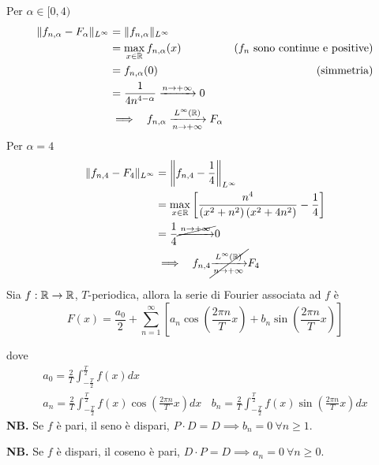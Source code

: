 \begin{enumerate}
Per $\alpha \in [ 0,4)$\begin{equation*}
\begin{aligned}
\Vert f_{n,\alpha } -F_{\alpha }\Vert _{L^{\infty }} & =\Vert f_{n,\alpha }\Vert _{L^{\infty }} & \\
 & =\max_{x\in \RR } f_{n,\alpha }( x) & \left( f_{n} \ \text{sono continue e positive}\right)\\
 & =f_{n,\alpha }( 0) & \text{(simmetria)}\\
 & =\frac{1}{4n^{4-\alpha }}\xrightarrow{n\rightarrow +\infty } 0 & \\
 & \implies \ \ f_{n,\alpha }\xrightarrow[n\rightarrow +\infty ]{L^{\infty }(\RR )} F_{\alpha } & 
\end{aligned}
\end{equation*}Per $\alpha =4$\begin{equation*}
\begin{aligned}
\Vert f_{n,4} -F_{4}\Vert _{L^{\infty }} & =\left\Vert f_{n,4} -\frac{1}{4}\right\Vert _{L^{\infty }}\\
 & =\max_{x\in \mathbb{R} }\left[\frac{n^{4}}{\left( x^{2} +n^{2}\right)\left( x^{2} +4n^{2}\right)} -\frac{1}{4}\right]\\
 & =\frac{1}{4}\cancel{\xrightarrow{n\rightarrow +\infty }} 0\\
 & \implies \ \ f_{n,4}\cancel{\xrightarrow[n\rightarrow +\infty ]{L^{\infty }(\mathbb{R} )}} F_{4}
\end{aligned}
\end{equation*}
\end{enumerate}
\Soluzione
\begin{thm}
Sia $f:\mathbb{R} \rightarrow \mathbb{R} $, $T$-periodica, allora la serie di Fourier associata ad $f$ è\begin{equation*}
F( x) =\frac{a_{0}}{2} +\sum\limits ^{\infty }_{n=1}\left[ a_{n}\cos\left(\frac{2\pi n}{T} x\right) +b_{n}\sin\left(\frac{2\pi n}{T} x\right)\right]
\end{equation*}

dove
\begin{gather*}
a_{0} =\frac{2}{T}\int ^{\frac{T}{2}}_{-\frac{T}{2}} f( x) dx\\
a_{n} =\frac{2}{T}\int ^{\frac{T}{2}}_{-\frac{T}{2}} f( x)\cos\left(\frac{2\pi n}{T} x\right) dx\ \ \ \ b_{n} =\frac{2}{T}\int ^{\frac{T}{2}}_{-\frac{T}{2}} f( x)\sin\left(\frac{2\pi n}{T} x\right) dx
\end{gather*}
\textbf{NB.} Se $f$ è pari, il seno è dispari, $P\cdotp D=D\implies b_{n} =0\ \forall n\geqslant 1$.

\textbf{NB.} Se $f$ è dispari, il coseno è pari, $D\cdotp P=D\implies a_{n} =0\ \forall n\geqslant 0$.
\end{thm}
